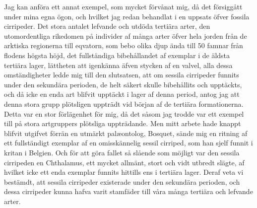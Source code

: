 Jag kan anföra ett annat exempel, som mycket förvånat mig, då det försiggått under mina egna ögon, och hvilket jag redan behandlat i en uppsats öfver fossila cirripeder. Det stora antalet lefvande och utdöda tertiära arter, den utomordentliga rikedomen på individer af många arter öfver hela jorden från de arktiska regionerna till eqvatorn, som bebo olika djup ända till 50 famnar från flodens högsta höjd, det fullständiga bibehållandet af exemplar i de äldsta tertiära lager, lättheten att igenkänna äfven stycken af en valvel, alla dessa omständigheter ledde mig till den slutsatsen, att om sessila cirripeder funnits under den sekundära perioden, de helt säkert skulle bibehållits och upptäckts, och då icke en enda art blifvit upptäckt i lager af denna period, antog jag att denna stora grupp plötsligen uppträdt vid början af de tertiära formationerna. Detta var en stor förlägenhet för mig, då det såsom jag trodde var ett exempel till på stora artgruppers plötsliga uppträdande. Men mitt arbete hade knappt blifvit utgifvet förrän en utmärkt palæontolog, Bosquet, sände mig en ritning af ett fullständigt exemplar af en omisskännelig sessil cirriped, som han sjelf funnit i kritan i Belgien. Och för att göra fallet så slående som möjligt var den sessila cirripeden en Chthalamus, ett mycket allmänt, stort och vidt utbredt slägte, af hvilket icke ett enda exemplar funnits hittills ens i tertiära lager. Deraf veta vi bestämdt, att sessila cirripeder existerade under den sekundära perioden, och dessa cirripeder kunna hafva varit stamfäder till våra många tertiära och lefvande arter.

